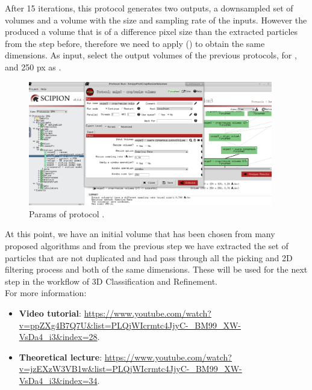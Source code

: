 After 15 iterations, this protocol generates two outputs, a downsampled set of volumes and a volume with the size and sampling rate of the inputs. However the  produced a volume that is of a difference pixel size than the extracted particles from the step before, therefore we need to apply  () to obtain the same dimensions. As input, select the output volume\/s of the previous protocols,  for , and 250 px as .

\begin{figure}[H]
  \centering
  \captionsetup{width=.8\linewidth} 
  \includegraphics[width=0.95\textwidth]
  {images/8h_xmipp3_crop_resize.pdf}
  \caption{Params of protocol .}
  \label{fig:crop_resize_volumes2}
  \end{figure}

 At this point, we have an initial volume that has been chosen from many proposed algorithms and from the previous step we have extracted the set of particles that are not duplicated and had pass through all the picking and 2D filtering process and both of the same dimensions. These will be used for the next step in the workflow of 3D Classification and Refinement.\\
 
   For more information: 
\begin{itemize}
   \item \textbf{Video tutorial}: \url{https://www.youtube.com/watch?v=ppZXg4B7Q7U&list=PLQjWIcrmtc4JjyC-_BM99_XW-VsDa4_i3&index=28}.
   \item \textbf{Theoretical lecture}: \url{https://www.youtube.com/watch?v=jzEXzW3VB1w&list=PLQjWIcrmtc4JjyC-_BM99_XW-VsDa4_i3&index=34}.
  \end{itemize}

